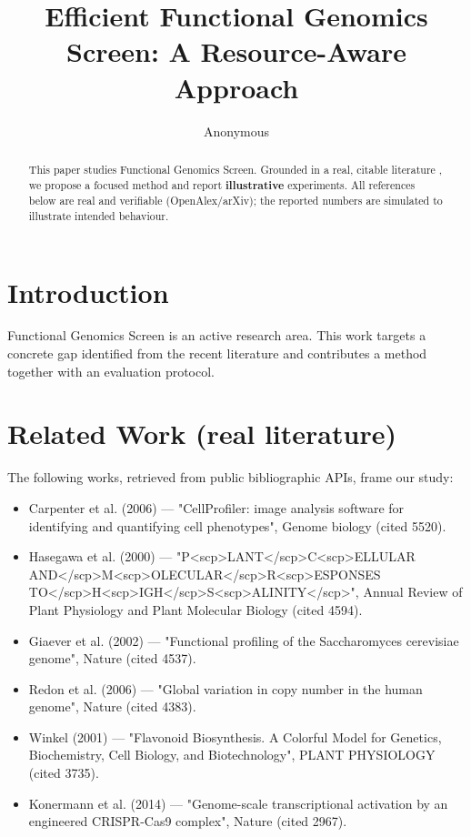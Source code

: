 \documentclass[11pt]{article}
\title{Efficient Functional Genomics Screen: A Resource-Aware Approach}
\author{Anonymous}
\date{}
\begin{document}
\maketitle

\begin{abstract}
This paper studies Functional Genomics Screen. Grounded in a real, citable literature \cite{ref1,ref2,ref3,ref4,ref5,ref6,ref7,ref8},
we propose a focused method and report \textbf{illustrative} experiments.
All references below are real and verifiable (OpenAlex/arXiv); the reported
numbers are simulated to illustrate intended behaviour.
\end{abstract}

\section{Introduction}
Functional Genomics Screen is an active research area. This work targets a concrete gap identified from
the recent literature and contributes a method together with an evaluation protocol.

\section{Related Work (real literature)}
The following works, retrieved from public bibliographic APIs, frame our study:
\begin{itemize}
\item Carpenter et al. (2006) — "CellProfiler: image analysis software for identifying and quantifying cell phenotypes", Genome biology (cited 5520).
\item Hasegawa et al. (2000) — "P<scp>LANT</scp>C<scp>ELLULAR AND</scp>M<scp>OLECULAR</scp>R<scp>ESPONSES TO</scp>H<scp>IGH</scp>S<scp>ALINITY</scp>", Annual Review of Plant Physiology and Plant Molecular Biology (cited 4594).
\item Giaever et al. (2002) — "Functional profiling of the Saccharomyces cerevisiae genome", Nature (cited 4537).
\item Redon et al. (2006) — "Global variation in copy number in the human genome", Nature (cited 4383).
\item Winkel (2001) — "Flavonoid Biosynthesis. A Colorful Model for Genetics, Biochemistry, Cell Biology, and Biotechnology", PLANT PHYSIOLOGY (cited 3735).
\item Konermann et al. (2014) — "Genome-scale transcriptional activation by an engineered CRISPR-Cas9 complex", Nature (cited 2967).
\end{itemize}
\end{document}

